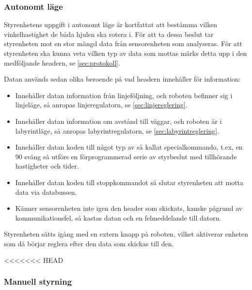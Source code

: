 \subsubsection{Autonomt läge}

Styrenhetens uppgift i autonomt läge är kortfattat att bestämma vilken vinkelhastighet de båda hjulen ska rotera i. 
För att ta dessa beslut tar styrenheten mot en stor mängd data från sensorenheten som analyseras.
För att styrenheten ska kunna veta vilken typ av data som mottas märks detta upp i den
medföljande headern, se \ref{sec:protokoll}. 

Datan används sedan olika beroende på vad headern innehåller för information:
 
 \begin{itemize}
 
\item Innehåller datan information från linjeföljning, och roboten befinner sig i linjeläge, 
så anropas linjeregulatorn, se \ref{sec:linjereglering}.

\item Innehåller datan information om avstånd till väggar, och roboten är i labyrintläge,
 så anropas labyrintregulatorn, se \ref{sec:labyrintreglering}.

\item Innehåller datan koden till något typ av så kallat specialkommando, t.ex, en 90\degree 
sväng så utförs en förprogrammerad serie av styrbeslut med tillhörande hastigheter och tider.

\item Innehåller datan koden till stoppkommandot så slutar styrenheten att motta data via databussen.

\item Känner sensorenheten inte igen den header som skickats, kanske pågrund av kommunikationsfel,
så kastas datan och en felmeddelande till datorn.

\end{itemize}

Styrenheten sätts igång med en extern knapp på roboten, vilket aktiverar enheten som då börjar
reglera efter den data som skickas till den.

<<<<<<< HEAD
\subsubsection{Manuell styrning}

